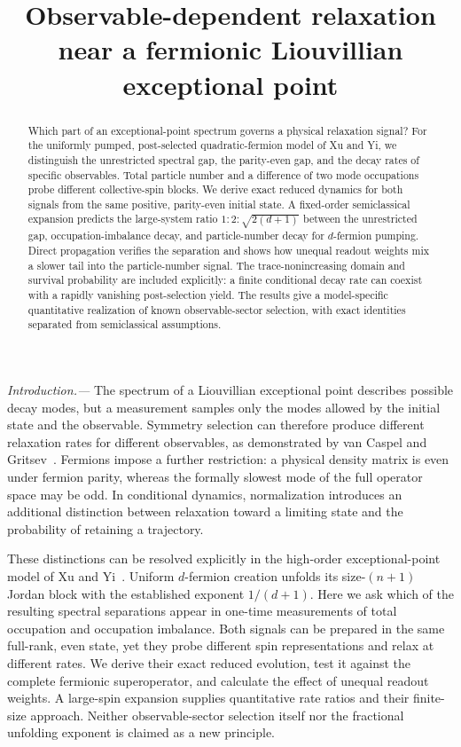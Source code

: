 \documentclass[aps,pra,reprint,superscriptaddress,nofootinbib]{revtex4-2}
\begin{document}
\title{Observable-dependent relaxation near a fermionic Liouvillian exceptional point}
\begin{abstract}
Which part of an exceptional-point spectrum governs a physical relaxation signal? For the uniformly pumped, post-selected quadratic-fermion model of Xu and Yi, we distinguish the unrestricted spectral gap, the parity-even gap, and the decay rates of specific observables. Total particle number and a difference of two mode occupations probe different collective-spin blocks. We derive exact reduced dynamics for both signals from the same positive, parity-even initial state. A fixed-order semiclassical expansion predicts the large-system ratio $1:2:\sqrt{2(d+1)}$ between the unrestricted gap, occupation-imbalance decay, and particle-number decay for $d$-fermion pumping. Direct propagation verifies the separation and shows how unequal readout weights mix a slower tail into the particle-number signal. The trace-nonincreasing domain and survival probability are included explicitly: a finite conditional decay rate can coexist with a rapidly vanishing post-selection yield. The results give a model-specific quantitative realization of known observable-sector selection, with exact identities separated from semiclassical assumptions.
\end{abstract}
\maketitle

\emph{Introduction.---}
The spectrum of a Liouvillian exceptional point describes possible decay modes, but a measurement samples only the modes allowed by the initial state and the observable. Symmetry selection can therefore produce different relaxation rates for different observables, as demonstrated by van Caspel and Gritsev~\cite{vanCaspel}. Fermions impose a further restriction: a physical density matrix is even under fermion parity, whereas the formally slowest mode of the full operator space may be odd. In conditional dynamics, normalization introduces an additional distinction between relaxation toward a limiting state and the probability of retaining a trajectory.

These distinctions can be resolved explicitly in the high-order exceptional-point model of Xu and Yi~\cite{XuYi}. Uniform $d$-fermion creation unfolds its size-$(n+1)$ Jordan block with the established exponent $1/(d+1)$. Here we ask which of the resulting spectral separations appear in one-time measurements of total occupation and occupation imbalance. Both signals can be prepared in the same full-rank, even state, yet they probe different spin representations and relax at different rates. We derive their exact reduced evolution, test it against the complete fermionic superoperator, and calculate the effect of unequal readout weights. A large-spin expansion supplies quantitative rate ratios and their finite-size approach. Neither observable-sector selection itself nor the fractional unfolding exponent is claimed as a new principle.
\end{document}
